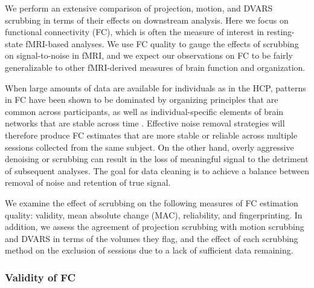 \documentclass{article}
\begin{document}
We perform an extensive comparison of projection, motion, and DVARS scrubbing in terms of their effects on downstream analysis. Here we focus on functional connectivity (FC), which is often the measure of interest in resting-state fMRI-based analyses. We use FC quality to gauge the effects of scrubbing on signal-to-noise in fMRI, and we expect our observations on FC to be fairly generalizable to other fMRI-derived measures of brain function and organization.

When large amounts of data are available for individuals as in the HCP, patterns in FC have been shown to be dominated by organizing principles that are common across participants, as well as individual-specific elements of brain networks that are stable across time \citep{Gratton2018FunctionalVariation}. Effective noise removal strategies will therefore produce FC estimates that are more stable or reliable across multiple sessions collected from the same subject. On the other hand, overly aggressive denoising or scrubbing can result in the loss of meaningful signal to the detriment of subsequent analyses. The goal for data cleaning is to achieve a balance between removal of noise and retention of true signal.

We examine the effect of scrubbing on the following measures of FC estimation quality: 
validity, mean absolute change (MAC), reliability, and fingerprinting.  In addition, we assess the agreement of projection scrubbing with motion scrubbing and DVARS in terms of the volumes they flag, and the effect of each scrubbing method on the exclusion of sessions due to a lack of sufficient data remaining.


\subsubsection{Validity of FC}\label{sec:validity_methods}
\end{document}

